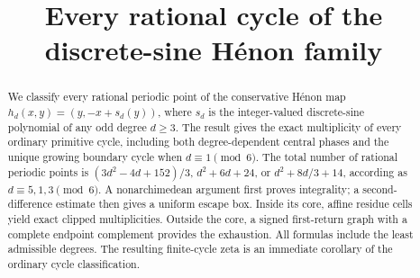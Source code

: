 \documentclass[11pt]{article}
\title{Every rational cycle of the discrete-sine H\'enon family}
\author{}
\date{}
\begin{document}
\maketitle
\begin{abstract}
We classify every rational periodic point of the conservative H\'enon map
$h_d(x,y)=(y,-x+s_d(y))$, where $s_d$ is the integer-valued
discrete-sine polynomial of any odd degree $d\ge3$. The result gives the
exact multiplicity of every ordinary primitive cycle, including both
degree-dependent central phases and the unique growing boundary cycle
when $d\equiv1\pmod6$. The total number of rational periodic points is
$(3d^2-4d+152)/3$, $d^2+6d+24$, or $d^2+8d/3+14$, according as
$d\equiv5,1,3\pmod6$. A nonarchimedean argument first proves integrality;
a second-difference estimate then gives a uniform escape box. Inside its
core, affine residue cells yield exact clipped multiplicities. Outside the
core, a signed first-return graph with a complete endpoint complement
provides the exhaustion. All formulas include the least admissible
degrees. The resulting finite-cycle zeta is an immediate corollary of
the ordinary cycle classification.
\end{abstract}








\appendix



\end{document}
